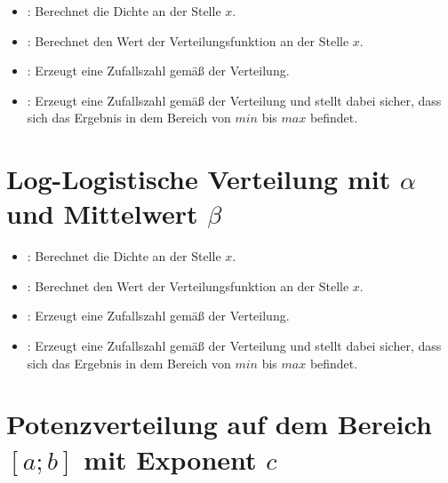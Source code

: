 \begin{itemize}

\item
{}:
Berechnet die Dichte an der Stelle $x$.

\item
{}:
Berechnet den Wert der Verteilungsfunktion an der Stelle $x$.

\item
{}:
Erzeugt eine Zufallszahl gemäß der Verteilung.

\item
{}:
Erzeugt eine Zufallszahl gemäß der Verteilung und stellt dabei sicher, dass sich das Ergebnis in dem Bereich von $min$ bis $max$ befindet.

\end{itemize}



\section{Log-Logistische Verteilung mit \texorpdfstring{$\alpha$}{alpha} und Mittelwert \texorpdfstring{$\beta$}{beta}}

\begin{itemize}

\item
{}:
Berechnet die Dichte an der Stelle $x$.

\item
{}:
Berechnet den Wert der Verteilungsfunktion an der Stelle $x$.

\item
{}:
Erzeugt eine Zufallszahl gemäß der Verteilung.

\item
{}:
Erzeugt eine Zufallszahl gemäß der Verteilung und stellt dabei sicher, dass sich das Ergebnis in dem Bereich von $min$ bis $max$ befindet.

\end{itemize}



\section{Potenzverteilung auf dem Bereich \texorpdfstring{$[a;b]$}{[a;b]} mit Exponent \texorpdfstring{$c$}{c}}

